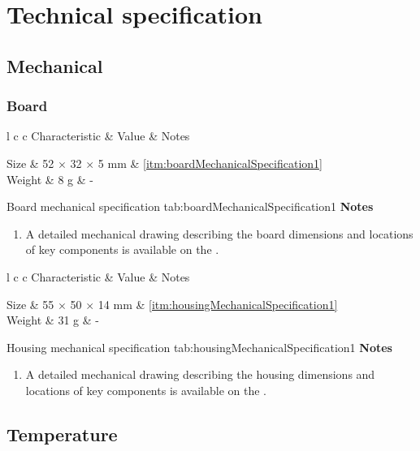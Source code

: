 \section{Technical specification}

\newcommand{\techincalTable}[5]{
    \customTable
    {l c c}
    {#1 & Value & Notes}
    {
        #2
    }
    {#3}
    {#4}
    \textbf{Notes}
    \begin{enumerate}[nolistsep]
        #5
    \end{enumerate}
}

\newcommand{\characteristicTable}[4]{
    \techincalTable
    {Characteristic}
    {#1}
    {#2}
    {#3}
    {#4}
}

\newcommand{\conditionTable}[4]{
    \techincalTable
    {Condition}
    {#1}
    {#2}
    {#3}
    {#4}
}

\subsection{Mechanical}

\subsubsection{Board}

\newcommand{\noteMechanicalDrawings}[1]{A detailed mechanical drawing describing the #1 dimensions and locations of key components is available on the \productWebPage{}.}

\characteristicTable
{
    Size & 52 $\times$ 32 $\times$ 5 mm & \ref{itm:boardMechanicalSpecification1}\\
    Weight & 8 g & -\\
}
{Board mechanical specification}
{tab:boardMechanicalSpecification1}
{
    \item \label{itm:boardMechanicalSpecification1} \noteMechanicalDrawings{board}
}

\characteristicTable
{
    Size & 55 $\times$ 50 $\times$ 14 mm & \ref{itm:housingMechanicalSpecification1}\\
    Weight & 31 g & -\\
}
{Housing mechanical specification}
{tab:housingMechanicalSpecification1}
{
    \item \label{itm:housingMechanicalSpecification1} \noteMechanicalDrawings{housing}
}

\subsection{Temperature}
\label{sec:temperature}

